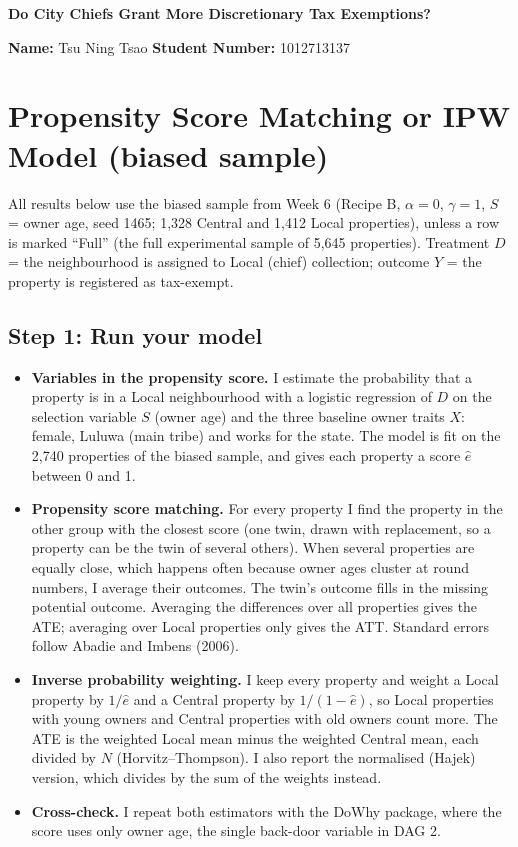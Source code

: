 \documentclass[11pt]{article}
\begin{document}
\begin{center}
{\Large\bfseries Do City Chiefs Grant More Discretionary Tax Exemptions?}

\vspace{4pt}
\textbf{Name:} Tsu Ning Tsao \quad \textbf{Student Number:} 1012713137
\end{center}

\section{Propensity Score Matching or IPW Model (biased sample)}
All results below use the biased sample from Week 6 (Recipe B, $\alpha=0$, $\gamma=1$, $S$ = owner age, seed 1465; 1,328 Central and 1,412 Local properties), unless a row is marked ``Full'' (the full experimental sample of 5,645 properties). Treatment $D$ = the neighbourhood is assigned to Local (chief) collection; outcome $Y$ = the property is registered as tax-exempt.

\subsection{Step 1: Run your model}
\begin{itemize}
\item \textbf{Variables in the propensity score.} I estimate the probability that a property is in a Local neighbourhood with a logistic regression of $D$ on the selection variable $S$ (owner age) and the three baseline owner traits $X$: female, Luluwa (main tribe) and works for the state. The model is fit on the 2,740 properties of the biased sample, and gives each property a score $\hat e$ between 0 and 1.
\item \textbf{Propensity score matching.} For every property I find the property in the other group with the closest score (one twin, drawn with replacement, so a property can be the twin of several others). When several properties are equally close, which happens often because owner ages cluster at round numbers, I average their outcomes. The twin's outcome fills in the missing potential outcome. Averaging the differences over all properties gives the ATE; averaging over Local properties only gives the ATT. Standard errors follow Abadie and Imbens (2006).
\item \textbf{Inverse probability weighting.} I keep every property and weight a Local property by $1/\hat e$ and a Central property by $1/(1-\hat e)$, so Local properties with young owners and Central properties with old owners count more. The ATE is the weighted Local mean minus the weighted Central mean, each divided by $N$ (Horvitz--Thompson). I also report the normalised (Hajek) version, which divides by the sum of the weights instead.
\item \textbf{Cross-check.} I repeat both estimators with the DoWhy package, where the score uses only owner age, the single back-door variable in DAG 2.
\end{itemize}
\end{document}
